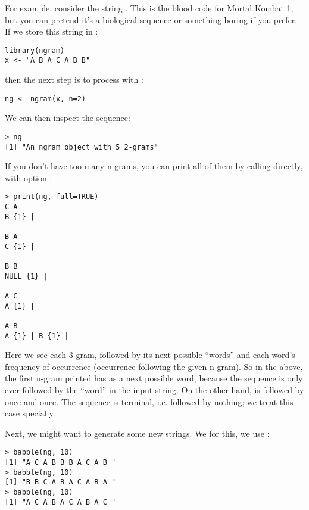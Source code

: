 For example, consider the string . This is the blood code 
for Mortal Kombat 1, but you can pretend it's a biological sequence or 
something boring if you prefer.  If we store this string in :

\begin{lstlisting}[language=rr]
library(ngram)
x <- "A B A C A B B"
\end{lstlisting}

then the next step is to process with :

\begin{lstlisting}[language=rr]
ng <- ngram(x, n=2)
\end{lstlisting}

We can then inspect the sequence:

\begin{lstlisting}[language=inteRactive]
> ng
[1] "An ngram object with 5 2-grams"
\end{lstlisting}

If you don't have too many n-grams, you can print all of them by calling 
 directly, with option :
\begin{lstlisting}[language=inteRactive]
> print(ng, full=TRUE)
C A 
B {1} | 

B A 
C {1} | 

B B 
NULL {1} | 

A C 
A {1} | 

A B 
A {1} | B {1} | 
\end{lstlisting}

Here we see each 3-gram, followed by its next possible ``words'' and each 
word's frequency of occurrence (occurrence following the given n-gram).  So in 
the above, the first n-gram printed  has  as a next 
possible word, because the sequence  is only ever followed by the 
``word''  in the input string.  On the other hand,  is 
followed by  once and  once.  The sequence  is 
terminal, i.e. followed by nothing; we treat this case specially.

Next, we might want to generate some new strings.  We for this, we use 
:

\begin{lstlisting}[language=inteRactive]
> babble(ng, 10)
[1] "A C A B B B A C A B "
> babble(ng, 10)
[1] "B B C A B A C A B A "
> babble(ng, 10)
[1] "A C A B A C A B A C "
\end{lstlisting}

